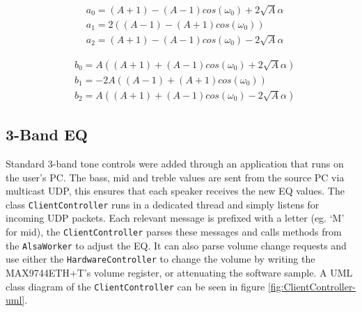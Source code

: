 \documentclass[main.tex]{subfiles}
\begin{document}
\begin{center}
    \begin{minipage}{.5\linewidth}
        \begin{equation*}
            \begin{aligned} 
                &a_0 = (A + 1) - (A - 1)cos(\omega_ 0) + 2\sqrt{A} \alpha \\
                &a_1 = 2((A - 1) - (A + 1)cos(\omega_ 0)) \\
                &a_2 = (A + 1) - (A - 1)cos(\omega_ 0) - 2\sqrt{A} \alpha
            \end{aligned}
        \end{equation*}
        \end{minipage}%
        \begin{minipage}{.5\linewidth}
        \begin{equation}
            \begin{aligned}
                &b_0 = A((A + 1) + (A - 1)cos(\omega _0) + 2\sqrt{A} \alpha) \\
                &b_1 = -2A((A - 1) + (A + 1)cos(\omega _0)) \\
                &b_2 = A((A + 1) + (A - 1)cos(\omega_ 0) - 2\sqrt{A} \alpha)
            \end{aligned}
        \end{equation}
    \end{minipage}
    \end{center}

\medskip 


\subsection{3-Band EQ}
Standard 3-band tone controls were added through an application that runs on the user's PC.
The bass, mid and treble values are sent from the source PC via multicast UDP, this ensures that each speaker receives the new EQ values.
The class \lstinline{ClientController} runs in a dedicated thread and simply listens for incoming UDP packets. 
Each relevant message is prefixed with a letter (eg. `M' for mid), the \lstinline{ClientController} parses these messages and calls methods from the \lstinline{AlsaWorker} to adjust the EQ.
It can also parse volume change requests and use either the \lstinline{HardwareController} to change the volume by writing the MAX9744ETH+T's volume register, or attenuating the software sample. 
A UML class diagram of the \lstinline{ClientController} can be seen in figure \ref{fig:ClientController-uml}.
\end{document}
